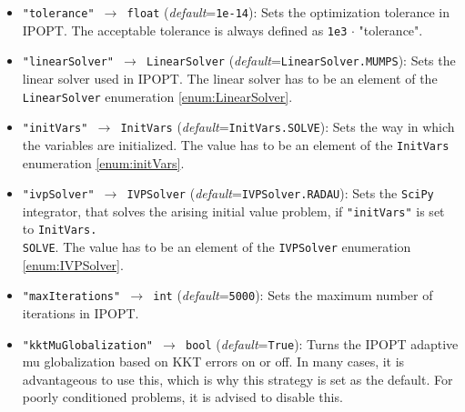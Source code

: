 \documentclass[12pt]{article}
\begin{document}
\begin{mdframed}[backgroundcolor=gray!10, roundcorner=10pt,
		linewidth=1pt]

	\begin{itemize}

		\label{flag:tolerance}
		\item \texttt{"tolerance" $\rightarrow$ float}
		      (\emph{default}=\texttt{1e-14}): Sets the optimization
		      tolerance in IPOPT. The
		      acceptable tolerance is always defined as \texttt{1e3}
		      $\cdot$ "tolerance".

		      \label{flag:linearSolver}
		\item \texttt{"linearSolver" $\rightarrow$ LinearSolver}
		      (\emph{default}=\texttt{LinearSolver.MUMPS}): Sets the
		      linear solver used in
		      IPOPT. The linear solver has to be an element of the
		      \texttt{LinearSolver}
		      enumeration \eqref{enum:LinearSolver}.

		      \label{flag:initVars}
		\item \texttt{"initVars" $\rightarrow$ InitVars}
		      (\emph{default}=\texttt{InitVars.SOLVE}): Sets the way in
		      which the variables
		      are initialized. The value has to be an element of the
		      \texttt{InitVars}
		      enumeration \eqref{enum:initVars}.

		      \label{flag:ivpSolver}
		\item \texttt{"ivpSolver" $\rightarrow$ IVPSolver}
		      (\emph{default}=\texttt{IVPSolver.RADAU}): Sets the
		      \texttt{SciPy} integrator,
		      that solves the arising initial value problem, if
		      \texttt{"initVars"} is set to
		      \texttt{InitVars.\\SOLVE}. The value has to be an element
		      of the
		      \texttt{IVPSolver} enumeration \eqref{enum:IVPSolver}.

		      \label{flag:maxIterations}
		\item \texttt{"maxIterations" $\rightarrow$ int}
		      (\emph{default}=\texttt{5000}): Sets the maximum
		      number of iterations in IPOPT.

		      \label{flag:kktmuglobalization}
		\item \texttt{"kktMuGlobalization" $\rightarrow$ bool}
		      (\emph{default}=\texttt{True}): Turns the IPOPT adaptive mu globalization based on KKT errors on or off. In many cases, it is advantageous to use this, which is why this strategy is set as the default. For poorly conditioned problems, it is advised to disable this.



\end{itemize}
\end{mdframed}
\end{document}
